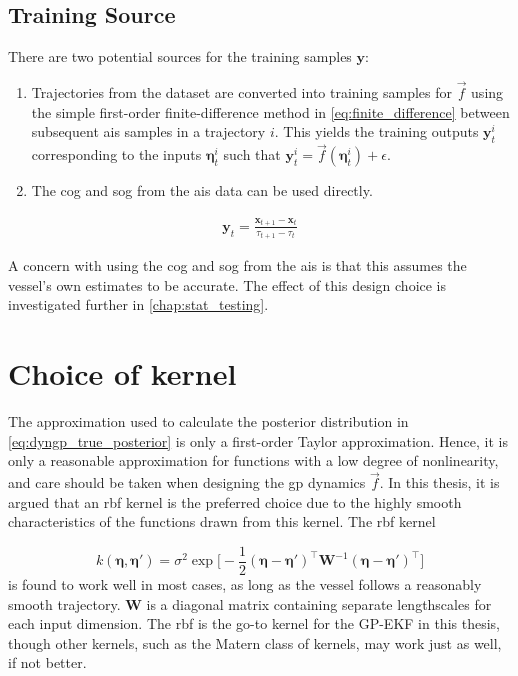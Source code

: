 \subsection{Training Source}
There are two potential sources for the training samples $\boldsymbol{y}$:

\begin{enumerate}
    \item Trajectories from the dataset are converted into training samples for $\vec{f}$ using the simple first-order finite-difference method in \cref{eq:finite_difference} between subsequent \acrshort{ais} samples in a trajectory $i$. This yields the training outputs $\boldsymbol{y}_t^{i}$ corresponding to the inputs $\boldsymbol{\eta}_t^i$ such that $\boldsymbol{y}_t^i = \vec{f}(\boldsymbol{\eta}_t^i) + \epsilon$.
    \item The \acrshort{cog} and \acrshort{sog} from the \acrshort{ais} data can be used directly.
\end{enumerate}

\begin{align}\label{eq:finite_difference}
    \boldsymbol{y}_t = \frac{\boldsymbol{x}_{t+1} - \boldsymbol{x}_t}{\tau_{t+1} - \tau_t}
\end{align}

A concern with using the \acrshort{cog} and \acrshort{sog} from the \acrshort{ais} is that this assumes the vessel's own estimates to be accurate. The effect of this design choice is investigated further in \cref{chap:stat_testing}.


\section{Choice of kernel}
The approximation used to calculate the posterior distribution in \cref{eq:dyngp_true_posterior} is only a first-order Taylor approximation. Hence, it is only a reasonable approximation for functions with a low degree of nonlinearity, and care should be taken when designing the \acrshort{gp} dynamics $\vec{f}$. In this thesis, it is argued that an \acrshort{rbf} kernel is the preferred choice due to the highly smooth characteristics of the functions drawn from this kernel. The \acrshort{rbf} kernel

\begin{equation}\label{eq:dyngp_kernel}
    k(\boldsymbol{\eta}, \boldsymbol{\eta}') = \sigma^2 \exp \big[ - \frac{1}{2} (\boldsymbol{\eta} - \boldsymbol{\eta}')^\intercal \boldsymbol{W}^{-1} (\boldsymbol{\eta} - \boldsymbol{\eta}')^\intercal\big]
\end{equation}
is found to work well in most cases, as long as the vessel follows a reasonably smooth trajectory. $\boldsymbol{W}$ is a diagonal matrix containing separate lengthscales for each input dimension. The \acrshort{rbf} is the go-to kernel for the GP-EKF in this thesis, though other kernels, such as the Matern class of kernels, may work just as well, if not better.

